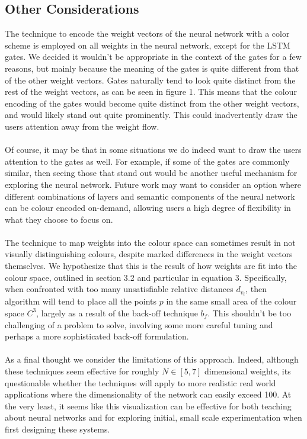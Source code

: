 \documentclass[journal]{vgtc}                %
\begin{document}
\subsection{Other Considerations}
The technique to encode the weight vectors of the neural network with a color scheme is employed on all weights in the neural network, except for the LSTM gates.
We decided it wouldn't be appropriate in the context of the gates for a few reasons, but mainly because the meaning of the gates is quite different from that of the other weight vectors.
Gates naturally tend to look quite distinct from the rest of the weight vectors, as can be seen in figure 1.
This means that the colour encoding of the gates would become quite distinct from the other weight vectors, and would likely stand out quite prominently.
This could inadvertently draw the users attention away from the weight flow.
\\
\\
Of course, it may be that in some situations we do indeed want to draw the users attention to the gates as well.
For example, if some of the gates are commonly similar, then seeing those that stand out would be another useful mechanism for exploring the neural network.
Future work may want to consider an option where different combinations of layers and semantic components of the neural network can be colour encoded on-demand, allowing users a high degree of flexibility in what they choose to focus on.
\\
\\
The technique to map weights into the colour space can sometimes result in not visually distinguishing colours, despite marked differences in the weight vectors themselves.
We hypothesize that this is the result of how weights are fit into the colour space, outlined in section 3.2 and particular in equation 3.
Specifically, when confronted with too many unsatisfiable relative distances $d_{v_i}$, then algorithm will tend to place all the points $p$ in the same small area of the colour space $C^3$, largely as a result of the back-off technique $b_f$.
This shouldn't be too challenging of a problem to solve, involving some more careful tuning and perhaps a more sophisticated back-off formulation.
\\
\\
As a final thought we consider the limitations of this approach.
Indeed, although these techniques seem effective for roughly $N \in [5, 7]$ dimensional weights, its questionable whether the techniques will apply to more realistic real world applications where the dimensionality of the network can easily exceed 100.
At the very least, it seems like this visualization can be effective for both teaching about neural networks and for exploring initial, small scale experimentation when first designing these systems.
\end{document}

